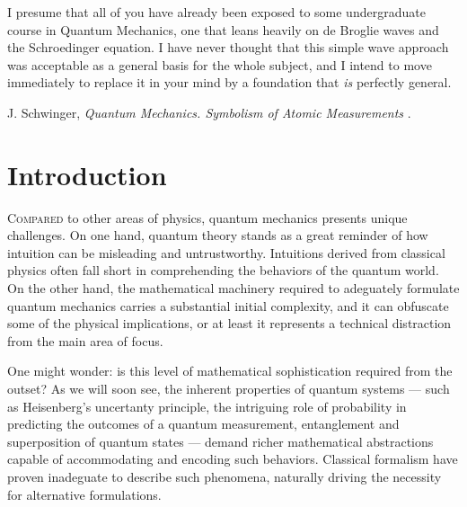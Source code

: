 


\label{chp:fundamentals} 


\begin{refsection}
\begin{quoting}
   \openquote 
   I presume that all of you have already been exposed to some undergraduate
   course in Quantum Mechanics, one that leans heavily on de Broglie waves and
   the Schroedinger equation. I have never thought that this simple wave
   approach was acceptable as a general basis for the whole subject, and I
   intend to move immediately to replace it in your mind by a foundation that
   \emph{is} perfectly general.~\closequote
   \begin{flushright}
       J. Schwinger,
       \emph{Quantum Mechanics. Symbolism of Atomic Measurements}
       \textcite{Schwinger:2001}.
    \end{flushright}
\end{quoting}

\section{Introduction}

\lettrine{C}{ompared} 
to other areas of physics, quantum mechanics presents unique challenges.
On one hand, quantum theory stands as a great reminder of how intuition can be misleading and untrustworthy.
 Intuitions derived from classical physics often fall short in comprehending the behaviors of the quantum world.
  On the other hand, the mathematical machinery required to adeguately formulate quantum mechanics carries a substantial initial complexity, and it can obfuscate some of the physical implications, or at least it represents a technical distraction from the main area of focus. 

  One might wonder: is this level of mathematical sophistication required from the outset?
  As we will soon see, the inherent properties of quantum systems --- 
  such as Heisenberg's uncertanty principle, the intriguing role of probability in predicting the
outcomes of a quantum measurement, entanglement and superposition of quantum
  states --- demand richer mathematical abstractions capable of accommodating and
encoding such behaviors. 
  Classical formalism have proven inadeguate to 
describe such phenomena, naturally driving the necessity for alternative formulations.


\end{refsection}
